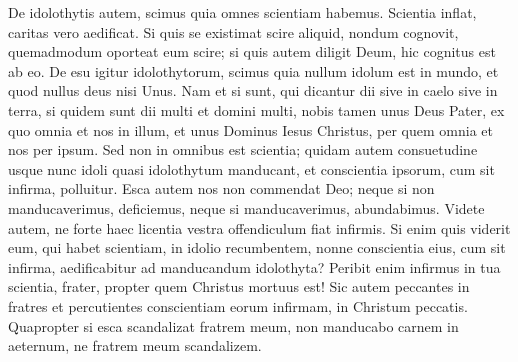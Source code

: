 \begin{biblechapter} 
\verse De idolothytis autem, scimus quia omnes scientiam habemus. Scientia inflat, caritas vero aedificat. 
\verse Si quis se existimat scire aliquid, nondum cognovit, quemadmodum oporteat eum scire; 
\verse si quis autem diligit Deum, hic cognitus est ab eo. 
\verse De esu igitur idolothytorum, scimus quia nullum idolum est in mundo, et quod nullus deus nisi Unus. 
\verse Nam et si sunt, qui dicantur dii sive in caelo sive in terra, si quidem sunt dii multi et domini multi, 
\verse nobis tamen unus Deus Pater, ex quo omnia et nos in illum, et unus Dominus Iesus Christus, per quem omnia et nos per ipsum. 
\verse Sed non in omnibus est scientia; quidam autem consuetudine usque nunc idoli quasi idolothytum manducant, et conscientia ipsorum, cum sit infirma, polluitur. 
\verse Esca autem nos non commendat Deo; neque si non manducaverimus, deficiemus, neque si manducaverimus, abundabimus. 
\verse Videte autem, ne forte haec licentia vestra offendiculum fiat infirmis. 
\verse Si enim quis viderit eum, qui habet scientiam, in idolio recumbentem, nonne conscientia eius, cum sit infirma, aedificabitur ad manducandum idolothyta? 
\verse Peribit enim infirmus in tua scientia, frater, propter quem Christus mortuus est! 
\verse Sic autem peccantes in fratres et percutientes conscientiam eorum infirmam, in Christum peccatis.  
\verse Quapropter si esca scandalizat fratrem meum, non manducabo carnem in aeternum, ne fratrem meum scandalizem. 
\end{biblechapter}


